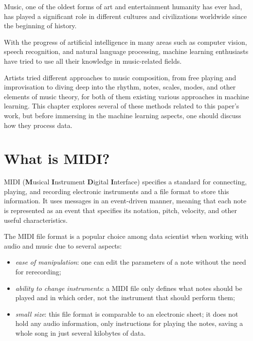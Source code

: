 Music, one of the oldest forms of art and entertainment humanity has ever had,
has played a significant role in different cultures and civilizations worldwide
since the beginning of history.

With the progress of artificial intelligence in many areas such as computer vision,
speech recognition, and natural language processing,
machine learning enthusiasts have tried
to use all their knowledge in music-related fields. \cite{musicCompositionML}

Artists tried different approaches to music composition,
from free playing and improvisation to diving deep into the
rhythm, notes, scales, modes, and other elements of music theory,
for both of them existing various approaches in machine learning.
This chapter explores several of these methods related to this paper's work,
but before immersing in the machine learning aspects, one should discuss how they process data.



\section{What is MIDI?}
MIDI (\textbf{M}usical \textbf{I}nstrument \textbf{D}igital \textbf{I}nterface) specifies a standard for connecting,
playing, and recording electronic instruments and a file format to store this information.
It uses messages in an event-driven manner,
meaning that each note is represented as an event that specifies its
notation, pitch, velocity, and other useful characteristics. \cite{midiCourse}

The MIDI file format is a popular choice among data scientist
when working with audio and music due to several aspects:

\begin{itemize}
  \item{
        \emph{ease of manipulation}:
        one can edit the parameters of a note without the need for rerecording; \cite{midiAmanda}
        }
  \item{
        \emph{ability to change instruments}:
        a MIDI file only defines what notes should be played and in which order,
        not the instrument that should perform them; \cite{midiAmanda}
        }
  \item{
        \emph{small size}: this file format is comparable to an electronic sheet;
        it does not hold any audio information,
        only instructions for playing the notes,
        saving a whole song in just several kilobytes of data. \cite{midiAmanda}
        }
\end{itemize}

